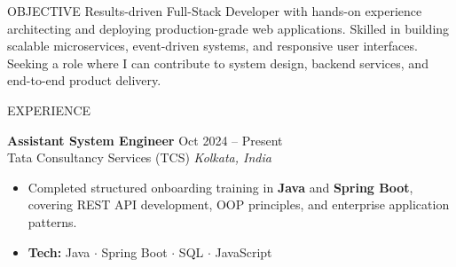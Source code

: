 \documentclass{resume}
\begin{document}

\begin{rSection}{OBJECTIVE}
Results-driven Full-Stack Developer with hands-on experience architecting and
deploying production-grade web applications. Skilled in building scalable
microservices, event-driven systems, and responsive user interfaces.
Seeking a role where I can contribute to system design, backend services,
and end-to-end product delivery.
\end{rSection}




\begin{rSection}{EXPERIENCE}

\textbf{Assistant System Engineer} \hfill Oct 2024 -- Present\\
Tata Consultancy Services (TCS) \hfill \textit{Kolkata, India}
\begin{itemize}
  \itemsep -3pt
  \item Completed structured onboarding training in \textbf{Java} and
        \textbf{Spring Boot}, covering REST API development, OOP principles,
        and enterprise application patterns.
  \item \textbf{Tech:} Java \(\cdot\) Spring Boot \(\cdot\) SQL \(\cdot\) JavaScript
\end{itemize}

\end{rSection}
\end{document}
